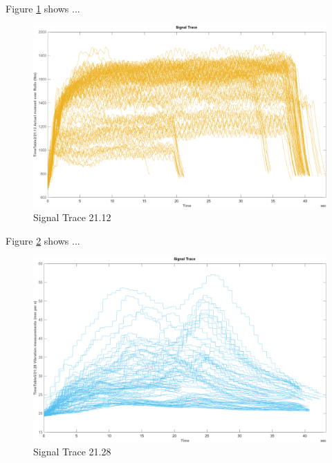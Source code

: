 \documentclass{article}
\begin{document}
Figure \ref{fig:SignalTrace21.12} shows ...
\begin{figure}[!ht]
    \centering
    \includegraphics[width=\textwidth, height=\textheight, keepaspectratio]{figures/SignalTrace21.12.png}
    \caption{Signal Trace 21.12}
    \label{fig:SignalTrace21.12}
\end{figure}

Figure \ref{fig:SignalTrace21.28} shows ...
\begin{figure}[!ht]
    \centering
    \includegraphics[width=\textwidth, height=\textheight, keepaspectratio]{figures/SignalTrace21.28.png}
    \caption{Signal Trace 21.28}
    \label{fig:SignalTrace21.28}
\end{figure}
\end{document}
